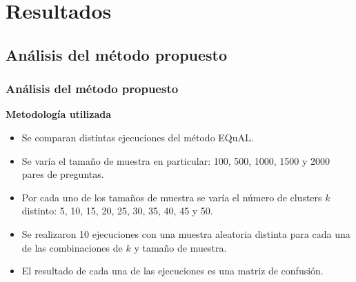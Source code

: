 \section{Resultados}

\subsection{Análisis del método propuesto}
\begin{frame}
	\frametitle{Análisis del método propuesto}

	\textbf{Metodología utilizada}
	\bigskip

	\begin{itemize}[<*>]
		\item Se comparan distintas ejecuciones del método EQuAL.
		\item Se varía el tamaño de muestra en particular: 100, 500, 1000, 1500 y 2000 pares de preguntas.
		\item Por cada uno de los tamaños de muestra se varía el número de clusters \(k\) distinto: 5, 10, 15, 20, 25, 30, 35, 40, 45 y 50.
		\item Se realizaron 10 ejecuciones con una muestra aleatoria distinta para cada una de las combinaciones de \(k\) y tamaño de muestra.
		\item El resultado de cada una de las ejecuciones es una matriz de confusión.
	\end{itemize}

	\framebreak


\end{frame}
